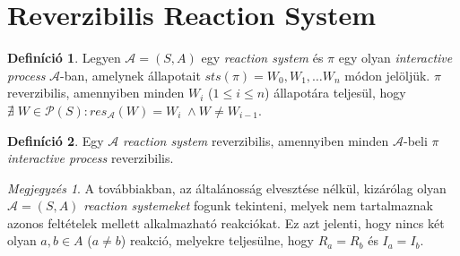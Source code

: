 \documentclass[12pt]{article}
\theoremstyle{definition}
\newtheorem*{definition*}{Definíció}
\theoremstyle{remark}
\newtheorem*{remark*}{Megjegyzés}
\theoremstyle{plain}
\begin{document}
    \section*{Reverzibilis Reaction System}

    \begin{definition*}
        Legyen $\mathscr{A} = (S, A)$ egy \textit{reaction system} és $\pi$ egy olyan \textit{interactive process} $\mathscr{A}$-ban, amelynek állapotait $\textit{sts}(\pi)=W_{0},W_{1},\ldots W_{n}$ módon jelöljük. $\pi$ reverzibilis, amennyiben minden $W_{i}$ ($1 \leq i \leq n$) állapotára teljesül, hogy $\nexists \; W \in \mathcal{P}(S) : res_{\mathscr{A}}(W) = W_{i} \; \wedge W \neq W_{i - 1}$.
    \end{definition*}

    \begin{definition*}
        Egy $\mathscr{A}$ \textit{reaction system} reverzibilis, amennyiben minden $\mathscr{A}$-beli $\pi$ \textit{interactive process} reverzibilis.
    \end{definition*}

    \begin{remark*}
        A továbbiakban, az általánosság elvesztése nélkül, kizárólag olyan $\mathscr{A} = (S, A)$ \textit{reaction systemeket} fogunk tekinteni, melyek nem tartalmaznak azonos feltételek mellett alkalmazható reakciókat. Ez azt jelenti, hogy nincs két olyan $a, b\in A$ ($a \neq b$) reakció, melyekre teljesülne, hogy $R_{a} = R_{b}$ és $I_{a} = I_{b}$.
    \end{remark*}
\end{document}
